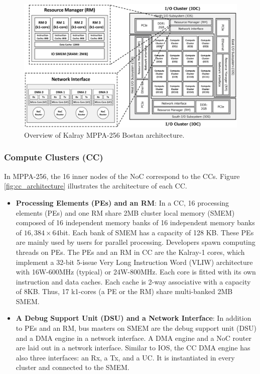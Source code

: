 \documentclass{sig-alternate-05-2015}
\begin{document}
\begin{figure}[t]
  \centering
  \includegraphics[width=1.0\linewidth]{../figure/mppa_architecture.eps}
  \caption{\label{fig:mppa_architecture}
    Overview of Kalray MPPA-256 Bostan architecture.}
\end{figure}

\subsubsection{Compute Clusters (CC)}
\label{sec:cc}
In MPPA-256, the 16 inner nodes of the NoC correspond to the CCs.
Figure \ref{fig:cc_architecture} illustrates the architecture of each CC.

\begin{itemize}
\item \textbf{Processing Elements (PEs) and an RM}:
In a CC, 16 processing elements (PEs) and one RM share 2MB cluster local memory (SMEM) composed of 16 independent memory banks of 16 independent memory banks of $16,384\times 64 $bit.
Each bank of SMEM has a capacity of 128 KB.
These PEs are mainly used by users for parallel processing.
Developers spawn computing threads on PEs.
The PEs and an RM in CC are the Kalray-1 cores, which implement a 32-bit 5-issue Very Long Instruction Word (VLIW) architecture with 16W-600MHz (typical) or 24W-800MHz.
Each core is fitted with its own instruction and data caches.
Each cache is 2-way associative with a capacity of 8KB.
Thus, 17 k1-cores (a PE or the RM) share multi-banked 2MB SMEM.

\item \textbf{A Debug Support Unit (DSU) and a Network Interface}:
In addition to PEs and an RM, bus masters on SMEM are the debug support unit (DSU) and a DMA engine in a network interface.
A DMA engine and a NoC router are laid out in a network interface.
Similar to IOS, the CC DMA engine has also three interfaces: an Rx, a Tx, and a UC. 
It is instantiated in every cluster and connected to the SMEM.
\end{itemize}
\end{document}
